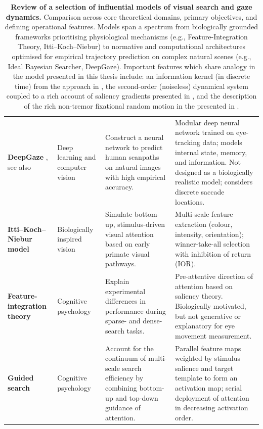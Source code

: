 \begin{table}[H]
\begin{tabularx}{\textwidth}{>{\raggedright\arraybackslash}p{2.6cm} >{\raggedright\arraybackslash}p{2.4cm} >{\raggedright\arraybackslash}p{3.6cm} >{\raggedright\arraybackslash}X}
		\addlinespace
		\textbf{DeepGaze} \newline \textcite{abdelrahman_deep_2026}, see also \cite{kummerer_modeling_2025,kammerer2016deepgaze2, kummerer_deepgaze_2022, huang_salicon_2015}
		& Deep learning and computer vision
		& Construct a neural network to predict human scanpaths on natural images with high empirical accuracy.
		& Modular deep neural network trained on eye-tracking data; models internal state, memory, and information. Not designed as a biologically realistic model; considers discrete saccade locations. \\
		\addlinespace
		\textbf{Itti--Koch--Niebur model} \newline \textcite{itti_model_1998}
		& Biologically inspired vision
		& Simulate bottom-up, stimulus-driven visual attention based on early primate visual pathways.
		& Multi-scale feature extraction (colour, intensity, orientation); winner-take-all selection with inhibition of return (IOR). \\
		\addlinespace
		\textbf{Feature-integration theory} \newline \textcite{Gayet2025-fv}
		& Cognitive psychology
		& Explain experimental differences in performance during sparse- and dense-search tasks.
		& Pre-attentive direction of attention based on saliency theory. Biologically motivated, but not generative or explanatory for eye movement measurement. \\
		\addlinespace
		\textbf{Guided search} \newline \textcite{wolfe_guided_1989, wolfe_guided_2021}
		& Cognitive psychology
		& Account for the continuum of multi-scale search efficiency by combining bottom-up and top-down guidance of attention.
		& Parallel feature maps weighted by stimulus salience and target template to form an activation map; serial deployment of attention in decreasing activation order. \\
		\bottomrule
	\end{tabularx}
	\caption{\textbf{Review of a selection of influential models of visual search and gaze dynamics.} Comparison across core theoretical domains, primary objectives, and defining operational features. Models span a spectrum from biologically grounded frameworks prioritising physiological mechanisms (e.g., Feature-Integration Theory, Itti--Koch--Niebur) to normative and computational architectures optimised for empirical trajectory prediction on complex natural scenes (e.g., Ideal Bayesian Searcher, DeepGaze). Important features which share analogy in the model presented in this thesis include: an information kernel (in discrete time) from the approach in \textcite{najemnik_optimal_2005}, the second-order (noiseless) dynamical system coupled to a rich account of saliency gradients presented in \textcite{NIPS2017_194cf6c2}, and the description of the rich non-tremor fixational random motion in the presented in \textcite{engbert_integrated_2011}.}
	\label{tab:search_models_colored}
\end{table}